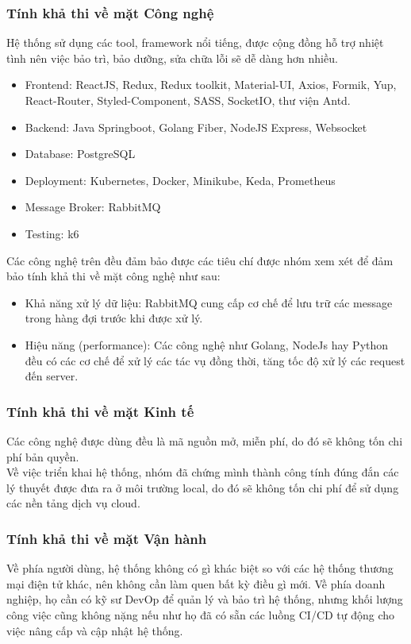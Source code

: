 \subsubsection{Tính khả thi về mặt Công nghệ}
\noindent Hệ thống sử dụng các tool, framework nổi tiếng, được cộng đồng hỗ trợ nhiệt tình nên việc bảo trì, bảo dưỡng, sửa chữa lỗi sẽ dễ dàng hơn nhiều.
\begin{itemize}
    \item Frontend: ReactJS, Redux, Redux toolkit, Material-UI, Axios, Formik, Yup, React-Router, Styled-Component, SASS, SocketIO, thư viện Antd.
    \item Backend: Java Springboot, Golang Fiber, NodeJS Express, Websocket
    \item Database: PostgreSQL
    \item Deployment: Kubernetes, Docker, Minikube, Keda, Prometheus
    \item Message Broker: RabbitMQ
    \item Testing: k6
\end{itemize}
\noindent Các công nghệ trên đều đảm bảo được các tiêu chí được nhóm xem xét để đảm bảo tính khả thi về
mặt công nghệ như sau:
\begin{itemize}
    \item Khả năng xử lý dữ liệu: RabbitMQ cung cấp cơ chế để lưu trữ các message trong hàng đợi trước
    khi được xử lý.
    \item Hiệu năng (performance): Các công nghệ như Golang, NodeJs hay Python đều có các cơ chế để xử
    lý các tác vụ đồng thời, tăng tốc độ xử lý các request đến server.
\end{itemize}
\subsubsection{Tính khả thi về mặt Kinh tế}
\noindent Các công nghệ được dùng đều là mã nguồn mở, miễn phí, do đó sẽ không tốn chi phí bản quyền.\\[0.5cm]
Về việc triển khai hệ thống, nhóm đã chứng mình thành công tính đúng đắn các lý thuyết được đưa ra ở môi trường local, do đó
sẽ không tốn chi phí để sử dụng các nền tảng dịch vụ cloud.
\subsubsection{Tính khả thi về mặt Vận hành}
\noindent Về phía người dùng, hệ thống không có gì khác biệt so với các hệ thống thương mại điện tử khác, 
nên không cần làm quen bất kỳ điều gì mới. Về phía doanh nghiệp, họ cần có kỹ sư DevOp để quản lý và bảo trì hệ thống, 
nhưng khối lượng công việc cũng không nặng nếu như họ đã có sẵn các luồng CI/CD tự động cho việc nâng cấp và 
cập nhật hệ thống.
